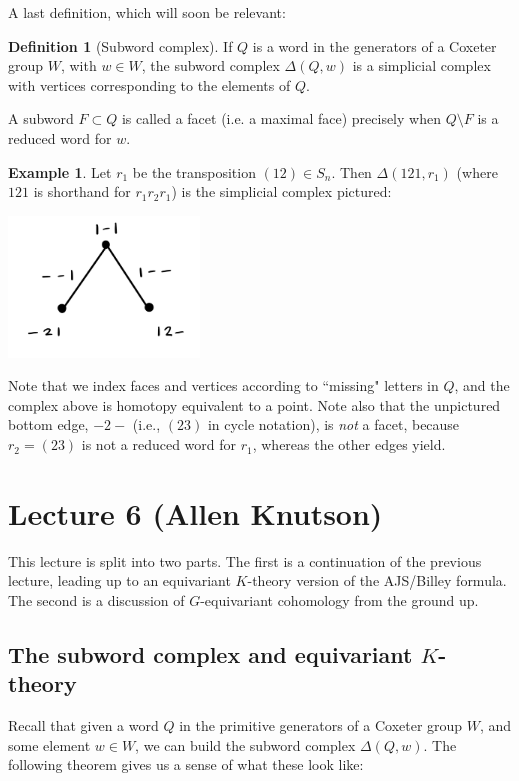 \documentclass[12pt]{amsart}
\numberwithin{equation}{section}
\theoremstyle{definition}
\newtheorem{Example}[equation]{Example}
\newtheorem{Definition}[equation]{Definition}
\numberwithin{figure}{section}
\begin{document}
A last definition, which will soon be relevant:

\begin{Definition}[Subword complex]
If $Q$ is a word in the generators of a Coxeter group $W$, with $w \in W$, the subword complex $\Delta(Q,w)$ is a simplicial complex with vertices corresponding to the elements of $Q$.

A subword $F \subset Q$ is called a facet (i.e. a maximal face) precisely when $Q \setminus F$ is a reduced word for $w$.
\end{Definition}

\begin{Example}
Let $r_1$ be the transposition $(12) \in S_n$. Then $\Delta(121, r_1)$ (where $121$ is shorthand for $r_1 r_2 r_1$) is the simplicial complex pictured: \vspace{1em}

\centerline{\includegraphics[width=2in]{5.2.jpeg}}

Note that we index faces and vertices according to ``missing" letters in $Q$, and the complex above is homotopy equivalent to a point. Note also that the unpictured bottom edge, $-2-$ (i.e., $(23)$ in cycle notation), is \textit{not} a facet, because $r_2 = (23)$ is not a reduced word for $r_1$, whereas the other edges yield.
\end{Example}

\section{Lecture 6 (Allen Knutson)}
This lecture is split into two parts.  The first is a continuation of the previous lecture, leading up to an equivariant $K$-theory version of the AJS/Billey formula.  The second is a discussion of $G$-equivariant cohomology from the ground up.

\subsection{The subword complex and equivariant $K$-theory} Recall that given a word $Q$ in the primitive generators of a Coxeter group $W$, and some element $w\in W$, we can build the subword complex $\Delta(Q,w)$. The following theorem gives us a sense of what these look like:
\end{document}
